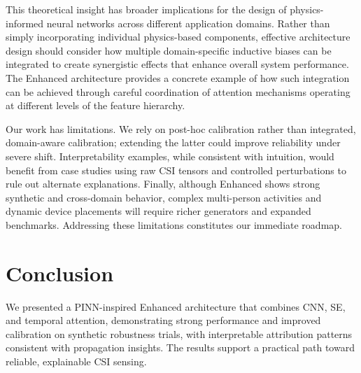\documentclass[journal]{IEEEtran}
\begin{document}
This theoretical insight has broader implications for the design of physics-informed neural networks across different application domains. Rather than simply incorporating individual physics-based components, effective architecture design should consider how multiple domain-specific inductive biases can be integrated to create synergistic effects that enhance overall system performance. The Enhanced architecture provides a concrete example of how such integration can be achieved through careful coordination of attention mechanisms operating at different levels of the feature hierarchy.

Our work has limitations. We rely on post-hoc calibration rather than integrated, domain-aware calibration; extending the latter could improve reliability under severe shift. Interpretability examples, while consistent with intuition, would benefit from case studies using raw CSI tensors and controlled perturbations to rule out alternate explanations. Finally, although Enhanced shows strong synthetic and cross-domain behavior, complex multi-person activities and dynamic device placements will require richer generators and expanded benchmarks. Addressing these limitations constitutes our immediate roadmap.

\section{Conclusion}
We presented a PINN-inspired Enhanced architecture that combines CNN, SE, and temporal attention, demonstrating strong performance and improved calibration on synthetic robustness trials, with interpretable attribution patterns consistent with propagation insights. The results support a practical path toward reliable, explainable CSI sensing.



\end{document}
